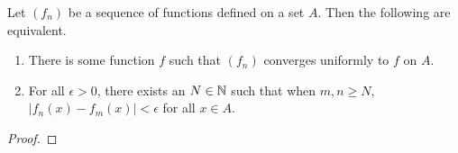 \documentclass[../main.tex]{subfiles}
\begin{document}
\begin{theorem}\label{trm:17.9}
    Let $(f_n)$ be a sequence of functions defined on a set $A$. Then the following are equivalent.
    \begin{enumerate}[label={\textup{(}\alph*\textup{)}}]
        \item There is some function $f$ such that $(f_n)$ converges uniformly to $f$ on $A$.
        \item For all $\epsilon>0$, there exists an $N\in\mathbb{N}$ such that when $m,n\geq N$, $|f_n(x)-f_m(x)|<\epsilon$ for all $x\in A$.
    \end{enumerate}
    \begin{proof}


\end{proof}
\end{theorem}
\end{document}
